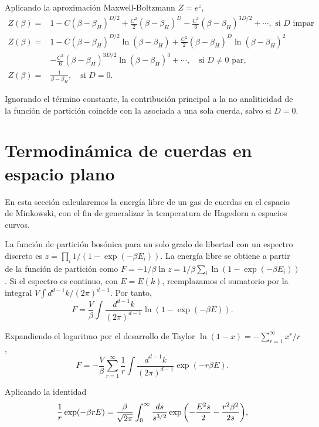 Aplicando la aproximación Maxwell-Boltzmann $Z=e^z$,
\begin{equation}
  \begin{aligned}
   Z(\beta)= &1-C(\beta-\beta_H)^{D/2} +\frac{C^2}{2}(\beta-\beta_H)^D-\frac{C^3}{6}(\beta-\beta_H)^{3D/2}+\cdots, \text{ si $D$ impar}\\
   Z(\beta)= &1-C(\beta-\beta_H)^{D/2}\ln(\beta-\beta_H) +\frac{C^2}{2}(\beta-\beta_H)^D\ln(\beta-\beta_H) ^2\\
         &-\frac{C^3}{6}(\beta-\beta_H)^{3D/2}\ln(\beta-\beta_H)^3 +\cdots, \quad \text{si $D\neq 0$ par},\\
   Z(\beta)=& \frac{1}{\beta-\beta_H}, \quad \text{si $D=0$}.
  \end{aligned}
\end{equation}

Ignorando el término constante, la contribución principal a la no analiticidad de la función de partición coincide
con la asociada a una sola cuerda, salvo si $D=0$.


\section{Termodinámica de cuerdas en espacio plano}

\label{sec:free}

En esta sección calcularemos la energía libre de un gas de cuerdas en el espacio de Minkowski,
con el fin de generalizar la temperatura de Hagedorn a espacios curvos.

La función de partición bosónica para un solo grado de libertad con un espectro discreto es $z=\prod_i 1/(1-\exp(-\beta E_i))$.
La energía libre se obtiene a partir de la función de partición como $F=-1/\beta \ln z=1/\beta\sum_i \ln(1-\exp(-\beta E_i))$.
Si el espectro es continuo, con $E=E(k)$, reemplazamos el sumatorio por la integral $V\int d^{d-1}k/(2\pi)^{d-1}$.
Por tanto,
\begin{equation}
  F=\frac{V}{\beta}\int \frac{d^{d-1}k}{(2\pi)^{d-1}}\ln(1-\exp(-\beta E)).
\end{equation}

Expandiendo el logaritmo por el desarrollo de Taylor $\ln(1-x)=-\sum^\infty_{r=1} x^r/r$,
\begin{equation}
  F=-\frac{V}{\beta}\sum^\infty_{r=1} \frac 1 r\int \frac{d^{d-1}k}{(2\pi)^{d-1}}\exp(-r\beta E).
\end{equation}

Aplicando la identidad
\begin{equation}
  \frac 1 r \exp(-\beta r E)=\frac{\beta}{\sqrt{2\pi}}\int_0^\infty \frac{ds}{s^{3/2}}\exp\qty(-\frac{E^2s}{2}-\frac{r^2\beta^2}{2s}),
\end{equation}

